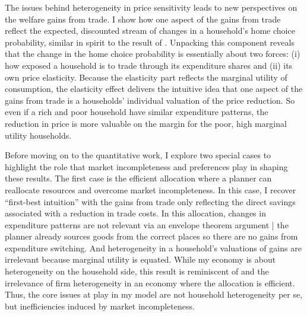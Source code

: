 \documentclass[12pt,pdftex]{article}
\begin{document}
\begin{onehalfspacing}
The issues behind heterogeneity in price sensitivity leads to new perspectives on the welfare gains from trade. I show how one aspect of the gains from trade reflect the expected, discounted stream of changes in a household's home choice probability, similar in spirit to the result of \citet*{arkolakis2012new}. Unpacking this component reveals that the change in the home choice probability is essentially about two forces: (i) how exposed a household is to trade through its expenditure shares and (ii) its own price elasticity. Because the elasticity part reflects the marginal utility of consumption, the elasticity effect delivers the intuitive idea that one aspect of the gains from trade is a households' individual valuation of the price reduction. So even if a rich and poor household have similar expenditure patterns, the reduction in price is more valuable on the margin for the poor, high marginal utility households.

Before moving on to the quantitative work, I explore two special cases to highlight the role that market incompleteness and preferences play in shaping these results. The first case is the efficient allocation where a planner can reallocate resources and overcome market incompleteness. In this case, I recover ``first-best intuition'' with the gains from trade only reflecting the direct savings associated with a reduction in trade costs. In this allocation, changes in expenditure patterns are not relevant via an envelope theorem argument | the planner already sources goods from the correct places so there are no gains from expenditure switching. And heterogeneity in a household's valuations of gains are irrelevant because marginal utility is equated. While my economy is about heterogeneity on the household side, this result is reminiscent of \citet{AtkesonBurstein2010} and the irrelevance of firm heterogeneity in an economy where the allocation is efficient. Thus, the core issues at play in my model are not household heterogeneity per se, but inefficiencies induced by market incompleteness.


\end{onehalfspacing}
\end{document}
